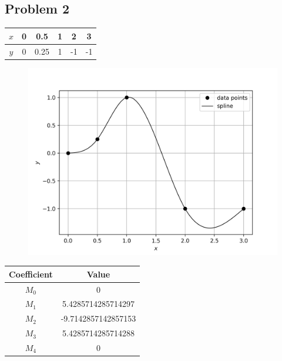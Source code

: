 \documentclass[12,a4paper]{article}
\begin{document}
    \subsection*{Problem 2}
    \begin{table}[H]
        \centering
        \begin{tabular}{ |c|c|c|c|c|c| }
            \hline
            $x$ & 0 & 0.5 & 1 & 2 & 3\\
            \hline
            $y$ & 0 & 0.25 & 1 & -1 & -1\\
            \hline
        \end{tabular}
    \end{table}
    \begin{figure}[H]
        \centering
        \includegraphics[width=\textwidth]{plots/q3b.png}
        \label{fig:my_label}
    \end{figure}
    \begin{table}[H]
        \centering
        \begin{tabular}{ |c|c|}
            \hline
            \textbf{Coefficient} & \textbf{Value}\\
            \hline
            $M_0$ & 0\\
            $M_1$ & 5.4285714285714297\\
            $M_2$ & -9.7142857142857153\\
            $M_3$ & 5.4285714285714288\\
            $M_4$ & 0\\
            \hline
        \end{tabular}
    \end{table}
    \newpage
\end{document}
